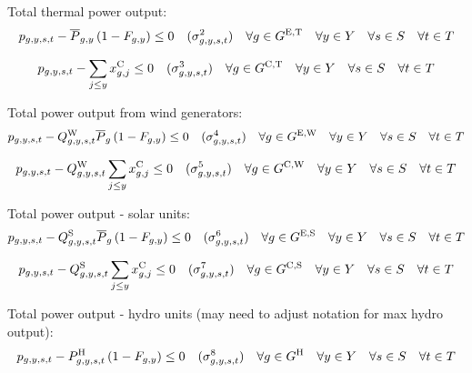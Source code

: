 \documentclass{article}
\newcommand{\sScenarioSets}{\quad \forall \iYear \in \sYears \quad \forall \iScenario \in \sScenarios \quad \forall \iInterval \in \sIntervals}
\begin{document}
Total thermal power output:
\begin{equation}
	\vPower - \cPowerOutputMax \left(1 - \cRetirementIndicator\right) \leq 0 \quad (\dMaxPowerOutputExistingThermal) \quad \forall \iGenerator \in \sGeneratorsExistingThermal \sScenarioSets
\end{equation}

\begin{equation}
	\vPower - \sum\limits_{\iYearAlias \leq \iYear} \vInstalledCapacity[\iGenerator,\iYearAlias] \leq 0 \quad (\dMaxPowerOutputCandidateThermal) \quad \forall \iGenerator \in \sGeneratorsCandidateThermal \sScenarioSets
\end{equation}

Total power output from wind generators:
\begin{equation}
	\vPower - \cCapacityFactorWind \cPowerOutputMax[\iGenerator] \left(1 - \cRetirementIndicator\right) \leq 0 \quad (\dMaxPowerOutputWindExisting) \quad \forall \iGenerator \in \sGeneratorsExistingWind \sScenarioSets
\end{equation}

\begin{equation}
	\vPower - \cCapacityFactorWind \sum\limits_{\iYearAlias \leq \iYear} \vInstalledCapacity[\iGenerator,\iYearAlias] \leq 0 \quad (\dMaxPowerOutputWindCandidate) \quad \forall \iGenerator \in \sGeneratorsCandidateWind \sScenarioSets
\end{equation}

Total power output - solar units:
\begin{equation}
	\vPower - \cCapacityFactorSolar \cPowerOutputMax[\iGenerator] \left(1 - \cRetirementIndicator\right) \leq 0 \quad (\dMaxPowerOutputSolarExisting) \quad \forall \iGenerator \in \sGeneratorsExistingSolar \sScenarioSets
\end{equation}

\begin{equation}
	\vPower - \cCapacityFactorSolar \sum\limits_{\iYearAlias \leq \iYear} \vInstalledCapacity[\iGenerator,\iYearAlias] \leq 0 \quad (\dMaxPowerOutputSolarCandidate) \quad \forall \iGenerator \in \sGeneratorsCandidateSolar \sScenarioSets
\end{equation}

Total power output - hydro units (may need to adjust notation for max hydro output):
\begin{equation}
	\vPower - \cPowerOutputHydro \left(1 - \cRetirementIndicator\right) \leq 0 \quad (\dMaxPowerOutputHydro) \quad \forall \iGenerator \in \sGeneratorsHydro \sScenarioSets
\end{equation}
\end{document}

